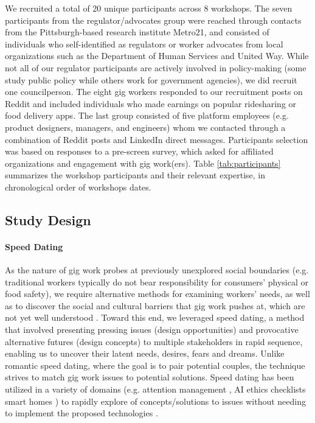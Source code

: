 We recruited a total of 20 unique participants across 8 workshops. The seven participants from the regulator/advocates group were reached through contacts from the Pittsburgh-based research institute Metro21, and consisted of individuals who self-identified as regulators or worker advocates from local organizations such as the Department of Human Services and United Way. While not all of our regulator participants are actively involved in policy-making (some study public policy while others work for government agencies), we did recruit one councilperson. The eight gig workers responded to our recruitment posts on Reddit and included individuals who made earnings on popular ridesharing or food delivery apps. The last group consisted of five platform employees (e.g. product designers, managers, and engineers) whom we contacted through a combination of Reddit posts and LinkedIn direct messages. Participants selection was based on responses to a pre-screen survey, which asked for affiliated organizations and engagement with gig work(ers). Table \ref{tab:participants} summarizes the workshop participants and their relevant expertise, in chronological order of workshops dates.
\subsection{Study Design} \label{procedures}
\paragraph{Speed Dating}
As the nature of gig work probes at previously unexplored social boundaries (e.g. traditional workers typically do not bear responsibility for consumers' physical or food safety), we require alternative methods for examining workers' needs, as well as to discover the social and cultural barriers that gig work pushes at, which are not yet well understood \cite{Davidoff2007-fq,Zimmerman2017-rq}.
Toward this end, we leveraged speed dating, a method that involved presenting pressing issues (design opportunities) and provocative alternative futures (design concepts) to multiple stakeholders in rapid sequence, enabling us to uncover their latent needs, desires, fears and dreams. 
Unlike romantic speed dating, where the goal is to pair potential couples, the technique strives to match gig work issues to potential solutions. 
Speed dating has been utilized in a variety of domains (e.g. attention management \cite{chou2022because}, AI ethics checklists \cite{madaio2020co} smart homes \cite{jin2022exploring}) to rapidly explore of concepts/solutions to issues without needing to implement the proposed technologies \cite{Davidoff2007-fq}. 

